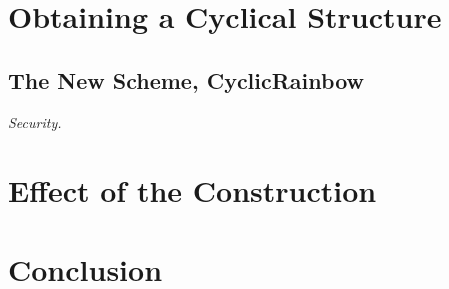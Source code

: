 \documentclass[a4paper, 14pt]{extarticle}
\begin{document}
\section{Obtaining a Cyclical Structure}

\subsection{The New Scheme, CyclicRainbow}

\emph{Security.}

\section{Effect of the Construction}

\section{Conclusion}


{\small
}
\end{document}
